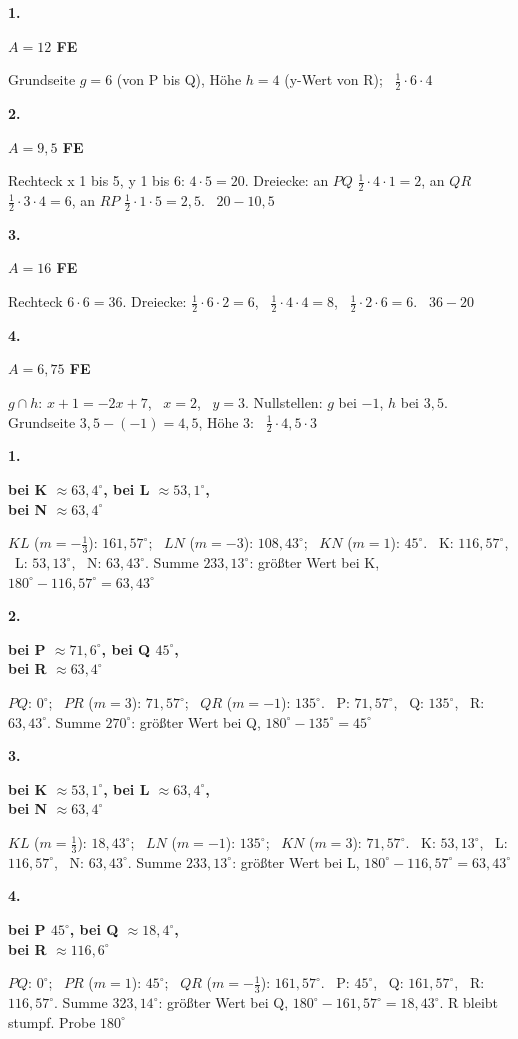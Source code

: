 \documentclass[11pt]{article}
\newcommand{\lk}[2]{\par\Needspace{30mm}\vspace{6pt}\noindent\colorbox{black!12}{\makebox[9mm]{\bfseries\strut #1}}\hspace{2mm}{\bfseries #2}\par\vspace{4pt}}
\newcommand{\lsg}[3]{\par\noindent\begin{minipage}[t]{7mm}\textbf{#1}\end{minipage}%
  \begin{minipage}[t]{50mm}\raggedright\bfseries\boldmath #2\end{minipage}\hspace{3mm}%
  \begin{minipage}[t]{\dimexpr\linewidth-60mm\relax}\raggedright\small #3\end{minipage}\par\vspace{3pt}}
\begin{document}
\lk{D4}{Flächeninhalt}
\lsg{1.}{$A = 12$ FE}{Grundseite $g = 6$ (von P bis Q), Höhe $h = 4$ (y-Wert von R); \ $\tfrac12\cdot 6\cdot 4$}
\lsg{2.}{$A = 9{,}5$ FE}{Rechteck x 1 bis 5, y 1 bis 6: $4\cdot 5 = 20$. Dreiecke: an $PQ$ $\tfrac12\cdot 4\cdot 1 = 2$, an $QR$ $\tfrac12\cdot 3\cdot 4 = 6$, an $RP$ $\tfrac12\cdot 1\cdot 5 = 2{,}5$. \ $20 - 10{,}5$}
\lsg{3.}{$A = 16$ FE}{Rechteck $6\cdot 6 = 36$. Dreiecke: $\tfrac12\cdot 6\cdot 2 = 6$, \ $\tfrac12\cdot 4\cdot 4 = 8$, \ $\tfrac12\cdot 2\cdot 6 = 6$. \ $36 - 20$}
\lsg{4.}{$A = 6{,}75$ FE}{$g \cap h$: $x + 1 = -2x + 7$, \ $x = 2$, \ $y = 3$. Nullstellen: $g$ bei $-1$, $h$ bei $3{,}5$. Grundseite $3{,}5 - (-1) = 4{,}5$, Höhe 3: \ $\tfrac12\cdot 4{,}5\cdot 3$}

\lk{D5}{Innenwinkel}
\lsg{1.}{bei K $\approx 63{,}4^\circ$, bei L $\approx 53{,}1^\circ$,\\ bei N $\approx 63{,}4^\circ$}{$KL$ ($m = -\tfrac13$): $161{,}57^\circ$; \ $LN$ ($m = -3$): $108{,}43^\circ$; \ $KN$ ($m = 1$): $45^\circ$. \ K: $116{,}57^\circ$, \ L: $53{,}13^\circ$, \ N: $63{,}43^\circ$. Summe $233{,}13^\circ$: größter Wert bei K, $180^\circ - 116{,}57^\circ = 63{,}43^\circ$}
\lsg{2.}{bei P $\approx 71{,}6^\circ$, bei Q $45^\circ$,\\ bei R $\approx 63{,}4^\circ$}{$PQ$: $0^\circ$; \ $PR$ ($m = 3$): $71{,}57^\circ$; \ $QR$ ($m = -1$): $135^\circ$. \ P: $71{,}57^\circ$, \ Q: $135^\circ$, \ R: $63{,}43^\circ$. Summe $270^\circ$: größter Wert bei Q, $180^\circ - 135^\circ = 45^\circ$}
\lsg{3.}{bei K $\approx 53{,}1^\circ$, bei L $\approx 63{,}4^\circ$,\\ bei N $\approx 63{,}4^\circ$}{$KL$ ($m = \tfrac13$): $18{,}43^\circ$; \ $LN$ ($m = -1$): $135^\circ$; \ $KN$ ($m = 3$): $71{,}57^\circ$. \ K: $53{,}13^\circ$, \ L: $116{,}57^\circ$, \ N: $63{,}43^\circ$. Summe $233{,}13^\circ$: größter Wert bei L, $180^\circ - 116{,}57^\circ = 63{,}43^\circ$}
\lsg{4.}{bei P $45^\circ$, bei Q $\approx 18{,}4^\circ$,\\ bei R $\approx 116{,}6^\circ$}{$PQ$: $0^\circ$; \ $PR$ ($m = 1$): $45^\circ$; \ $QR$ ($m = -\tfrac13$): $161{,}57^\circ$. \ P: $45^\circ$, \ Q: $161{,}57^\circ$, \ R: $116{,}57^\circ$. Summe $323{,}14^\circ$: größter Wert bei Q, $180^\circ - 161{,}57^\circ = 18{,}43^\circ$. R bleibt stumpf. Probe $180^\circ$ \checkmark}
\end{document}
